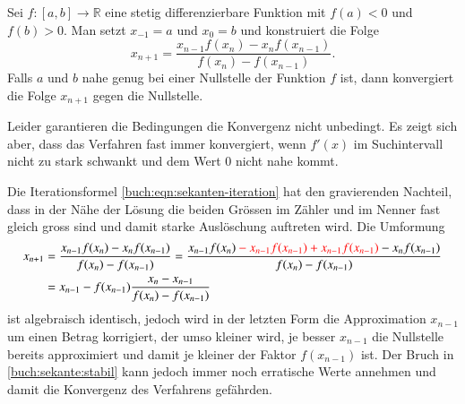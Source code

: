 \begin{algorithmus}[Sekantenverfahren]
Sei $f\colon[a,b]\to\mathbb R$ eine stetig differenzierbare Funktion mit
$f(a)<0$ und $f(b)>0$.
Man setzt $x_{-1}=a$ und $x_0=b$ und konstruiert die Folge
\begin{equation}
x_{n+1} = \frac{x_{n-1}f(x_n) - x_nf(x_{n-1})}{f(x_{n})-f(x_{n-1})}.
\label{buch:eqn:sekanten-iteration}
\end{equation}
Falls $a$ und $b$ nahe genug bei einer Nullstelle der Funktion $f$ ist,
dann konvergiert die Folge $x_{n+1}$ gegen die Nullstelle.
\end{algorithmus}

%

Leider garantieren die Bedingungen die Konvergenz nicht unbedingt.
Es zeigt sich aber, dass das Verfahren fast immer konvergiert, wenn
$f'(x)$ im Suchintervall nicht zu stark schwankt und dem Wert $0$
nicht nahe kommt.

Die Iterationsformel \eqref{buch:eqn:sekanten-iteration} hat den
gravierenden Nachteil, dass in der Nähe der Lösung die beiden
Grössen im Zähler und im Nenner fast gleich gross sind und damit
starke Auslöschung auftreten wird.
%
Die Umformung
\begin{align}
x_{n+1}
&=
\frac{x_{n-1}f(x_{n})-x_{n}f(x_{n-1})}{f(x_n)-f(x_{n-1})}
=
\frac{x_{n-1}f(x_{n})
{\color{red}\mathstrut -x_{n-1}f(x_{n-1})+x_{n-1}f(x_{n-1})}
-x_{n}f(x_{n-1})}{f(x_n)-f(x_{n-1})}
\\
&=x_{n-1} - f(x_{n-1})\frac{x_n-x_{n-1}}{f(x_n)-f(x_{n-1})}
\label{buch:sekante:stabil}
\end{align}
ist algebraisch identisch, jedoch wird in der letzten Form die Approximation
$x_{n-1}$ um einen Betrag korrigiert, der umso kleiner wird, je besser
$x_{n-1}$ die Nullstelle bereits approximiert und damit je kleiner
der Faktor $f(x_{n-1})$ ist.
Der Bruch in \eqref{buch:sekante:stabil} kann jedoch immer noch
erratische Werte annehmen und damit die Konvergenz des Verfahrens
gefährden.
%
%

